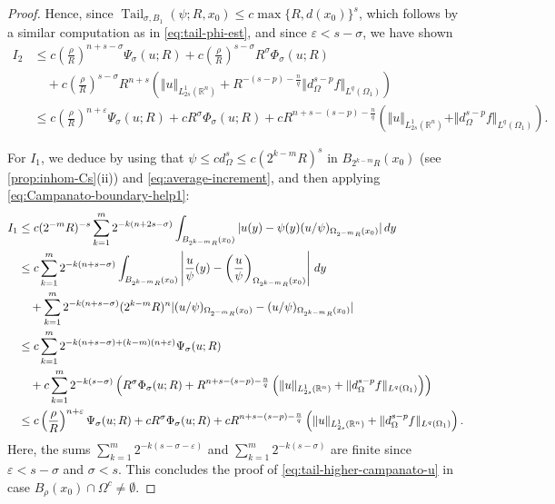 \documentclass[11pt,reqno]{amsart}
\theoremstyle{plain}
\theoremstyle{definition}
\numberwithin{equation}{section}
\newcommand{\R}{\mathbb{R}}
\newcommand{\1}{\mathbbm{1}}
\DeclareMathOperator{\tail}{Tail}
\renewcommand{\d}{\textnormal{\,d}}
\begin{document}
\begin{proof}
Hence, since $\tail_{\sigma,B_1}(\psi;R,x_0) \le c \max\{R,d(x_0)\}^s$, which follows by a similar computation as in \eqref{eq:tail-phi-est}, and since $\varepsilon < s-\sigma$, we have shown
\begin{align*}
I_2
&\le c \left( \frac{\rho}{R} \right)^{n+s-\sigma} \Psi_\sigma(u;R) + c\left( \frac{\rho}{R} \right)^{s - \sigma} R^{\sigma}\Phi_\sigma(u; R) \\
&\quad + c \left( \frac{\rho}{R} \right)^{s-\sigma} R^{n + s} \left( \Vert u \Vert_{L^1_{2s}(\R^n)} + R^{-(s-p) - \frac{n}{q}} \Vert d_{\Omega}^{s-p} f \Vert_{L^q(\Omega_{1})} \right) \\
&\le c \left( \frac{\rho}{R} \right)^{n+\varepsilon} \Psi_\sigma(u; R) + cR^\sigma \Phi_{\sigma}(u; R) + cR^{n + s-(s-p)-\frac{n}{q}} \left( \Vert u \Vert_{L^1_{2s}(\R^n)} + \Vert d_{\Omega}^{s-p} f \Vert_{L^q(\Omega_{1})} \right).
\end{align*}

For $I_1$, we deduce by using that $\psi \leq cd_\Omega^s \leq c(2^{k-m}R)^s$ in $B_{2^{k-m}R}(x_0)$ (see \autoref{prop:inhom-Cs}(ii)) and \eqref{eq:average-increment}, and then applying \eqref{eq:Campanato-boundary-help1}:
\begin{align*}
I_1
&\leq c(2^{-m}R)^{-s} \sum_{k = 1}^m 2^{-k(n+2s-\sigma)} \int_{B_{2^{k-m}R}(x_0)} |u(y)- \psi(y) (u/\psi)_{\Omega_{2^{-m}R}(x_0)}| \d y \\
&\leq c \sum_{k = 1}^m 2^{-k(n+s-\sigma)} \int_{B_{2^{k-m}R}(x_0)} \left| \frac{u}{\psi}(y)- \left( \frac{u}{\psi} \right)_{\Omega_{2^{k-m}R}(x_0)} \right| \d y \\
&\quad + \sum_{k = 1}^m 2^{-k(n+s-\sigma)} (2^{k-m}R)^n |(u/\psi)_{\Omega_{2^{-m}R}(x_0)} - (u/\psi)_{\Omega_{2^{k-m} R}(x_0)}|\\
&\leq c \sum_{k = 1}^m 2^{-k(n+s-\sigma)+(k-m)(n+\varepsilon)} \Psi_{\sigma}(u; R) \\
&\quad + c \sum_{k = 1}^m 2^{-k(s-\sigma)} \left( R^\sigma\Phi_{\sigma}(u; R) + R^{n + s-(s-p)-\frac{n}{q}} \left( \Vert u \Vert_{L^1_{2s}(\R^n)} + \Vert d_{\Omega}^{s-p} f \Vert_{L^q(\Omega_{1})} \right) \right) \\
&\leq c\left( \frac{\rho}{R} \right)^{n+\varepsilon} \Psi_{\sigma}(u; R) + cR^\sigma\Phi_{\sigma}(u; R) + cR^{n + s-(s-p)-\frac{n}{q}} \left( \Vert u \Vert_{L^1_{2s}(\R^n)} + \Vert d_{\Omega}^{s-p} f \Vert_{L^q(\Omega_{1})} \right).
\end{align*}
Here, the sums $\sum_{k=1}^m 2^{-k(s-\sigma-\varepsilon)}$ and $\sum_{k=1}^m 2^{-k(s-\sigma)}$ are finite since $\varepsilon < s-\sigma$ and $\sigma < s$. This concludes the proof of \eqref{eq:tail-higher-campanato-u} in case $B_{\rho}(x_0) \cap \Omega^c \not= \emptyset$.




\end{proof}
\end{document}
